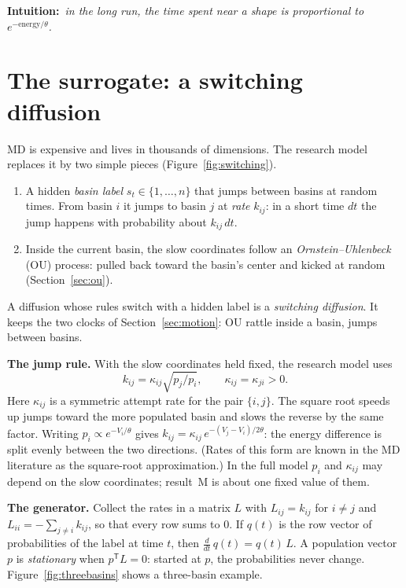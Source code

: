 \documentclass[11pt]{article}
\newcommand{\intuition}[1]{\begin{intuitionbox}\textsf{\textbf{Intuition:}}\ \textit{#1}%
  \end{intuitionbox}}
\newcommand{\transp}{\mathsf{T}}
\begin{document}
\intuition{in the long run, the time spent near a shape is proportional to
  $e^{-\text{energy}/\theta}$.}

\section{The surrogate: a switching diffusion}\label{sec:surrogate}

MD is expensive and lives in thousands of dimensions. The research model replaces it by two
simple pieces (Figure~\ref{fig:switching}).
\begin{enumerate}
  \item A hidden \emph{basin label} $s_t \in \{1, \dots, n\}$ that jumps between basins at
    random times. From basin $i$ it jumps to basin $j$ at \emph{rate} $k_{ij}$: in a short time
    $dt$ the jump happens with probability about $k_{ij}\,dt$.
  \item Inside the current basin, the slow coordinates follow an \emph{Ornstein--Uhlenbeck}
    (OU) process: pulled back toward the basin's center and kicked at random
    (Section~\ref{sec:ou}).
\end{enumerate}
A diffusion whose rules switch with a hidden label is a \emph{switching diffusion}. It keeps
the two clocks of Section~\ref{sec:motion}: OU rattle inside a basin, jumps between basins.

\textbf{The jump rule.} With the slow coordinates held fixed, the research model uses
\begin{equation}\label{eq:jump}
  k_{ij} = \kappa_{ij}\sqrt{p_j / p_i}, \qquad \kappa_{ij} = \kappa_{ji} > 0 .
\end{equation}
Here $\kappa_{ij}$ is a symmetric attempt rate for the pair $\{i, j\}$. The square root speeds
up jumps toward the more populated basin and slows the reverse by the same factor. Writing
$p_i \propto e^{-V_i/\theta}$ gives $k_{ij} = \kappa_{ij}\,e^{-(V_j - V_i)/2\theta}$: the energy
difference is split evenly between the two directions. (Rates of this form are known in the
MD literature as the square-root approximation.) In the full model $p_i$ and $\kappa_{ij}$ may
depend on the slow coordinates; result~M is about one fixed value of them.

\textbf{The generator.} Collect the rates in a matrix $L$ with $L_{ij} = k_{ij}$ for
$i \ne j$ and $L_{ii} = -\sum_{j \ne i} k_{ij}$, so that every row sums to $0$. If $q(t)$ is
the row vector of probabilities of the label at time $t$, then $\tfrac{d}{dt}\,q(t) = q(t)\,L$.
A population vector $p$ is \emph{stationary} when $p^\transp L = 0$: started at $p$, the
probabilities never change. Figure~\ref{fig:threebasins} shows a three-basin example.
\end{document}
